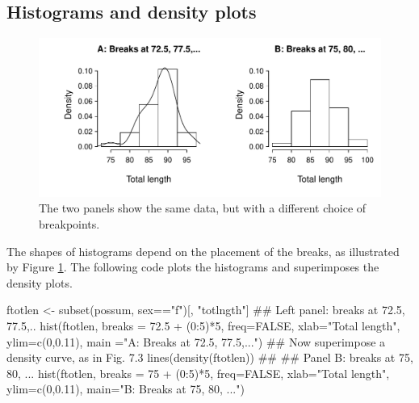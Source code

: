 \subsection*{Histograms and density plots}
\begin{figure}[htbp]
\vspace*{-18pt}

\begin{Schunk}


\centerline{\includegraphics[width=\textwidth]{figs/07-poss-hist-1} }

\end{Schunk}
 \caption{The two panels show the same data, but with a different
choice of breakpoints.\label{fig:densitybreaks}}
\vspace*{-15pt}
\end{figure}

The shapes of histograms depend on the placement of the breaks, as
illustrated by Figure \ref{fig:densitybreaks}.  The following code
plots the histograms and superimposes the density plots.
\begin{Schunk}
\begin{Sinput}
ftotlen <- subset(possum, sex=="f")[, "totlngth"]
## Left panel: breaks at 72.5, 77.5,..
hist(ftotlen, breaks = 72.5 + (0:5)*5, freq=FALSE,
     xlab="Total length", ylim=c(0,0.11),
     main ="A: Breaks at 72.5, 77.5,...")
## Now superimpose a density curve, as in Fig. 7.3
lines(density(ftotlen))
##
## Panel B: breaks at 75, 80, ...
hist(ftotlen, breaks = 75 + (0:5)*5, freq=FALSE,
     xlab="Total length", ylim=c(0,0.11),
     main="B: Breaks at 75, 80, ...")
\end{Sinput}
\end{Schunk}

